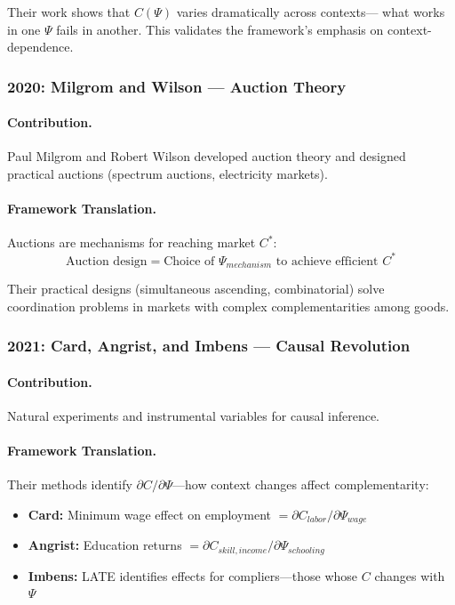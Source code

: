 Their work shows that $C(\Psi)$ varies dramatically across contexts---
what works in one $\Psi$ fails in another.
This validates the framework's emphasis on context-dependence.

\subsubsection{2020: Milgrom and Wilson --- Auction Theory}

\paragraph{Contribution.}
Paul Milgrom and Robert Wilson developed auction theory and designed practical auctions
(spectrum auctions, electricity markets).

\paragraph{Framework Translation.}
Auctions are mechanisms for reaching market $C^*$:
\begin{equation}
  \text{Auction design} = \text{Choice of } \Psi_{mechanism} \text{ to achieve efficient } C^*
\end{equation}

Their practical designs (simultaneous ascending, combinatorial) solve
coordination problems in markets with complex complementarities among goods.

\subsubsection{2021: Card, Angrist, and Imbens --- Causal Revolution}

\paragraph{Contribution.}
Natural experiments and instrumental variables for causal inference.

\paragraph{Framework Translation.}
Their methods identify $\partial C / \partial \Psi$---how context changes affect complementarity:
\begin{itemize}
  \item \textbf{Card:} Minimum wage effect on employment $= \partial C_{labor} / \partial \Psi_{wage}$
  \item \textbf{Angrist:} Education returns $= \partial C_{skill,income} / \partial \Psi_{schooling}$
  \item \textbf{Imbens:} LATE identifies effects for compliers---those whose $C$ changes with $\Psi$
\end{itemize}


